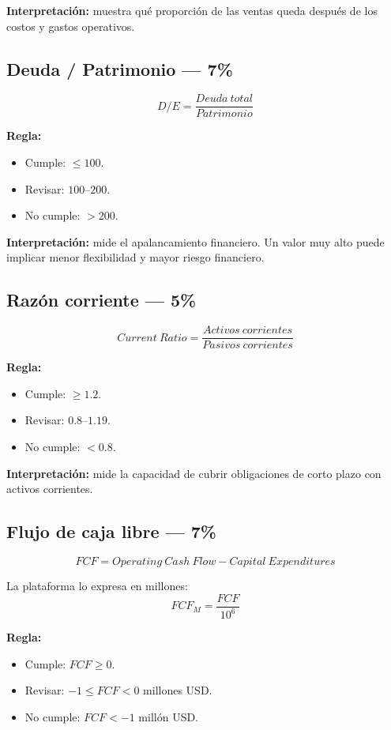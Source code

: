 \documentclass[11pt,a4paper]{article}
\begin{document}
\textbf{Interpretación:} muestra qué proporción de las ventas queda después de los costos y gastos operativos.

\subsection{Deuda / Patrimonio --- 7\%}
\[
\boxed{
D/E=\frac{Deuda\ total}{Patrimonio}
}
\]

\textbf{Regla:}
\begin{itemize}[leftmargin=*]
\item Cumple: $\leq100$.
\item Revisar: $100$--$200$.
\item No cumple: $>200$.
\end{itemize}

\textbf{Interpretación:} mide el apalancamiento financiero. Un valor muy alto puede implicar menor flexibilidad y mayor riesgo financiero.

\subsection{Razón corriente --- 5\%}
\[
\boxed{
Current\ Ratio=
\frac{Activos\ corrientes}{Pasivos\ corrientes}
}
\]

\textbf{Regla:}
\begin{itemize}[leftmargin=*]
\item Cumple: $\geq1.2$.
\item Revisar: $0.8$--$1.19$.
\item No cumple: $<0.8$.
\end{itemize}

\textbf{Interpretación:} mide la capacidad de cubrir obligaciones de corto plazo con activos corrientes.

\subsection{Flujo de caja libre --- 7\%}
\[
\boxed{
FCF=Operating\ Cash\ Flow-Capital\ Expenditures
}
\]

La plataforma lo expresa en millones:
\[
FCF_M=\frac{FCF}{10^6}
\]

\textbf{Regla:}
\begin{itemize}[leftmargin=*]
\item Cumple: $FCF\geq0$.
\item Revisar: $-1\leq FCF<0$ millones USD.
\item No cumple: $FCF<-1$ millón USD.
\end{itemize}
\end{document}
